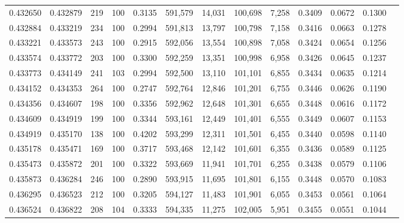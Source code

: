 \begin{tabular}{rrrrrrrrrrrrr}
0.432650 & 0.432879 &   219 & 100 &                                     0.3135 & 591,579 &  14,031 & 100,698 &   7,258 & 0.3409 & 0.0672 & 0.1300 \\
0.432884 & 0.433219 &   234 & 100 &                                     0.2994 & 591,813 &  13,797 & 100,798 &   7,158 & 0.3416 & 0.0663 & 0.1278 \\
0.433221 & 0.433573 &   243 & 100 &                                     0.2915 & 592,056 &  13,554 & 100,898 &   7,058 & 0.3424 & 0.0654 & 0.1256 \\
0.433574 & 0.433772 &   203 & 100 &                                     0.3300 & 592,259 &  13,351 & 100,998 &   6,958 & 0.3426 & 0.0645 & 0.1237 \\
0.433773 & 0.434149 &   241 & 103 &                                     0.2994 & 592,500 &  13,110 & 101,101 &   6,855 & 0.3434 & 0.0635 & 0.1214 \\
0.434152 & 0.434353 &   264 & 100 &                                     0.2747 & 592,764 &  12,846 & 101,201 &   6,755 & 0.3446 & 0.0626 & 0.1190 \\
0.434356 & 0.434607 &   198 & 100 &                                     0.3356 & 592,962 &  12,648 & 101,301 &   6,655 & 0.3448 & 0.0616 & 0.1172 \\
0.434609 & 0.434919 &   199 & 100 &                                     0.3344 & 593,161 &  12,449 & 101,401 &   6,555 & 0.3449 & 0.0607 & 0.1153 \\
0.434919 & 0.435170 &   138 & 100 &                                     0.4202 & 593,299 &  12,311 & 101,501 &   6,455 & 0.3440 & 0.0598 & 0.1140 \\
0.435178 & 0.435471 &   169 & 100 &                                     0.3717 & 593,468 &  12,142 & 101,601 &   6,355 & 0.3436 & 0.0589 & 0.1125 \\
0.435473 & 0.435872 &   201 & 100 &                                     0.3322 & 593,669 &  11,941 & 101,701 &   6,255 & 0.3438 & 0.0579 & 0.1106 \\
0.435873 & 0.436284 &   246 & 100 &                                     0.2890 & 593,915 &  11,695 & 101,801 &   6,155 & 0.3448 & 0.0570 & 0.1083 \\
0.436295 & 0.436523 &   212 & 100 &                                     0.3205 & 594,127 &  11,483 & 101,901 &   6,055 & 0.3453 & 0.0561 & 0.1064 \\
0.436524 & 0.436822 &   208 & 104 &                                     0.3333 & 594,335 &  11,275 & 102,005 &   5,951 & 0.3455 & 0.0551 & 0.1044 \\

\end{tabular}
